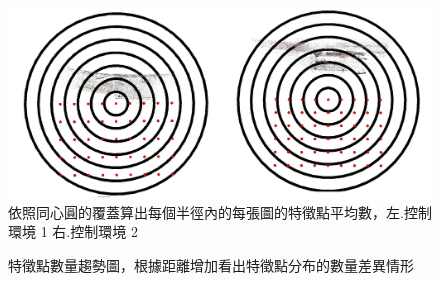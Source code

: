 \begin{figure}
\begin{center}
  \includegraphics[width=1.0\textwidth]{figures/CoverDisk.jpg}
  \caption{依照同心圓的覆蓋算出每個半徑內的每張圖的特徵點平均數，左.控制環境 1 右.控制環境 2}
  \label{fig:CoverDisk}
\end{center}
\end{figure}

\begin{figure}
	\begin{center}
	\end{center}
  \caption{特徵點數量趨勢圖，根據距離增加看出特徵點分布的數量差異情形}
  \label{fig:CoverDisk_DescriptorNum}	
\end{figure}

